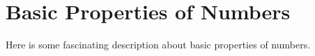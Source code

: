 \chapter{Basic Properties of Numbers}

Here is some fascinating description about basic properties of numbers.
